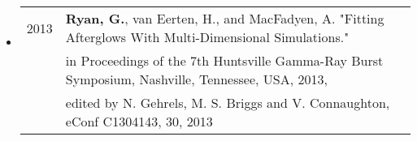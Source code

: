 \begin{itemize}
\item \begin{tabular}{ll}
2013 & {\bf Ryan, G.}, van Eerten, H., and MacFadyen, A. "Fitting Afterglows With Multi-Dimensional Simulations." \\& in Proceedings of the 7th Huntsville Gamma-Ray Burst Symposium, Nashville, Tennessee, USA, 2013, \\& edited by N. Gehrels, M. S. Briggs and V. Connaughton, eConf C1304143, 30, 2013 \\
\end{tabular}
\end{itemize}

